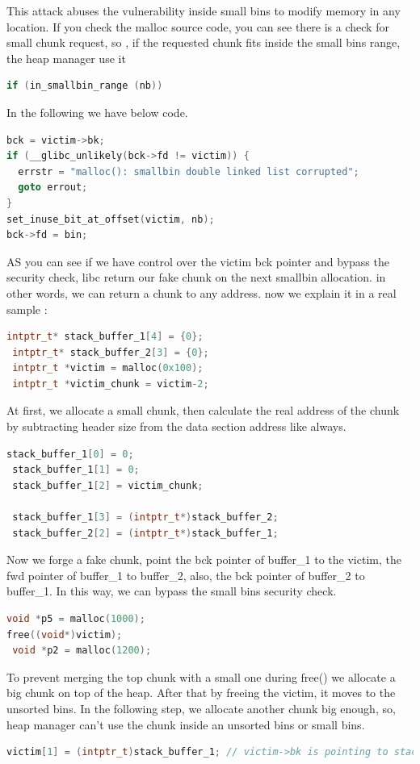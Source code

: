 \documentclass{masterthesis}
\newcommand*\ub{unsorted bins}
\newcommand*\sbs{small bins}
\begin{document}
This attack abuses the vulnerability inside \sbs{} to modify memory in any location. If you check the malloc source code, you can see there is a check for small chunk request, so , if the requested chunk fits inside the \sbs{} range, the heap manager use it 
\begin{lstlisting}[language=c,frame=tlrb]
if (in_smallbin_range (nb))
\end{lstlisting}
In the following we have below code.
\begin{lstlisting}[language=c,frame=tlrb]
bck = victim->bk;
if (__glibc_unlikely(bck->fd != victim)) {
  errstr = "malloc(): smallbin double linked list corrupted";
  goto errout;
}
set_inuse_bit_at_offset(victim, nb);
bck->fd = bin;
\end{lstlisting}
AS you can see if we have control over the victim bck pointer and bypass the security check, libc return our fake chunk on the next smallbin allocation. in other words, we can return a chunk to any address. now we explain it in a real sample :
\begin{lstlisting}[language=c,frame=tlrb]
 intptr_t* stack_buffer_1[4] = {0};
 intptr_t* stack_buffer_2[3] = {0};
 intptr_t *victim = malloc(0x100);
 intptr_t *victim_chunk = victim-2;
\end{lstlisting}
At first, we allocate a small chunk, then calculate the real address of the chunk by subtracting header size from the data section address like always.
\begin{lstlisting}[language=c,frame=tlrb]
 stack_buffer_1[0] = 0;
 stack_buffer_1[1] = 0;
 stack_buffer_1[2] = victim_chunk;

 stack_buffer_1[3] = (intptr_t*)stack_buffer_2;
 stack_buffer_2[2] = (intptr_t*)stack_buffer_1;
 \end{lstlisting}
 Now we forge a fake chunk, point the bck pointer of buffer\_1 to the victim, the fwd pointer of buffer\_1 to buffer\_2, also, the bck pointer of buffer\_2 to buffer\_1. In this way, we can bypass the \sbs{} security check. 
 \begin{lstlisting}[language=c,frame=tlrb]
 void *p5 = malloc(1000);
free((void*)victim);
 void *p2 = malloc(1200);
 \end{lstlisting}
 
To prevent merging the top chunk with a small one during free() we allocate a big chunk on top of the heap. After that by freeing the victim, it moves to the \ub{}. In the following step, we allocate another chunk big enough, so, heap manager can't use the chunk inside an \ub{} or \sbs{}.
 \begin{lstlisting}[language=c,frame=tlrb]
victim[1] = (intptr_t)stack_buffer_1; // victim->bk is pointing to stack
 \end{lstlisting}
  
\end{document}
